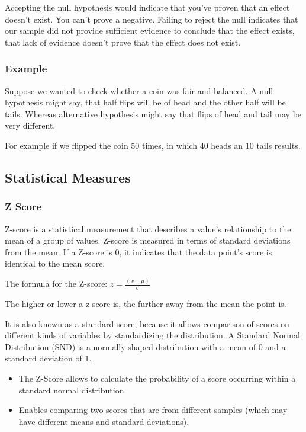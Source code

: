 \documentclass[11pt]{article}
\begin{document}
Accepting the null hypothesis would indicate that you've proven that an
effect doesn't exist. You can't prove a negative. Failing to reject the
null indicates that our sample did not provide sufficient evidence to
conclude that the effect exists, that lack of evidence doesn't prove
that the effect does not exist.

\hypertarget{example}{%
\subsubsection{Example}\label{example}}

Suppose we wanted to check whether a coin was fair and balanced. A null
hypothesis might say, that half flips will be of head and the other half
will be tails. Whereas alternative hypothesis might say that flips of
head and tail may be very different.

For example if we flipped the coin 50 times, in which 40 heads an 10
tails results.

    \hypertarget{statistical-measures}{%
\subsection{Statistical Measures}\label{statistical-measures}}

\hypertarget{z-score}{%
\subsubsection{Z Score}\label{z-score}}

Z-score is a statistical measurement that describes a value's
relationship to the mean of a group of values. Z-score is measured in
terms of standard deviations from the mean. If a Z-score is 0, it
indicates that the data point's score is identical to the mean score.

The formula for the Z-score: \(z=\frac{(x-\mu)}{\sigma}\)

The higher or lower a z-score is, the further away from the mean the
point is.

It is also known as a standard score, because it allows comparison of
scores on different kinds of variables by standardizing the
distribution. A Standard Normal Distribution (SND) is a normally shaped
distribution with a mean of 0 and a standard deviation of 1.

\begin{itemize}
\item
  The Z-Score allows to calculate the probability of a score occurring
  within a standard normal distribution.
\item
  Enables comparing two scores that are from different samples (which
  may have different means and standard deviations).
\end{itemize}
\end{document}
